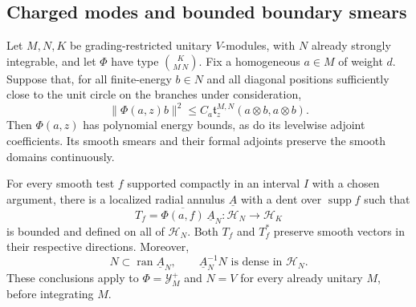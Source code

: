 \subsection{Charged modes and bounded boundary smears}

\begin{lemma}
\label{lem:charged-tools}
Let $M,N,K$ be grading-restricted unitary $V$-modules, with $N$ already
strongly integrable, and let $\Phi$ have type $\binom{K}{M\,N}$.
Fix a homogeneous $a\in M$ of weight $d$.  Suppose that, for all
finite-energy $b\in N$ and all diagonal positions sufficiently close
to the unit circle on the branches under consideration,
\begin{equation}\label{eq:transport-domination}
 \|\Phi(a,z)b\|^2
   \leq C_a\mathfrak t_z^{M,N}(a\otimes b,a\otimes b).
\end{equation}
Then $\Phi(a,z)$ has polynomial energy bounds, as do its levelwise
adjoint coefficients.  Its smooth smears and their formal adjoints
preserve the smooth domains continuously.

For every smooth test $f$ supported compactly in an interval $I$ with
a chosen argument, there is a localized radial annulus $\underline A$
with a dent over $\operatorname{supp}f$ such that
\begin{equation}\label{eq:charged-bounded-cutoff}
 T_f=\overline{\Phi(a,f)}\,\underline A_N
       :\mathcal H_N\longrightarrow\mathcal H_K
\end{equation}
is bounded and defined on all of $\mathcal H_N$.
Both $T_f$ and $T_f^*$ preserve smooth vectors in their respective
directions.  Moreover,
\[
 N\subset\operatorname{ran}\underline A_N,
 \qquad \underline A_N^{-1}N\text{ is dense in }\mathcal H_N.
\]
These conclusions apply to $\Phi=\mathcal Y_M^+$ and $N=V$ for every
already unitary $M$, before integrating $M$.
\end{lemma}

